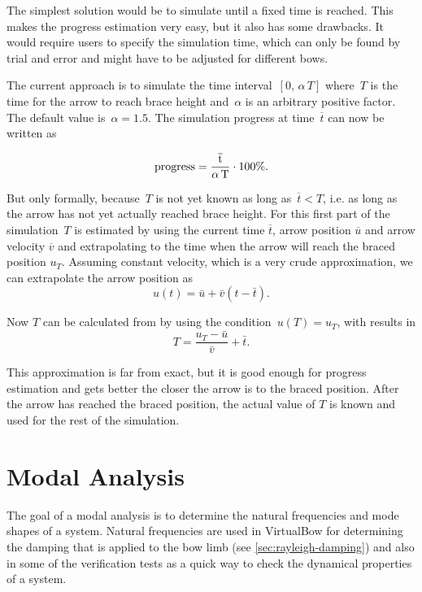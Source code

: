 The simplest solution would be to simulate until a fixed time is reached.
This makes the progress estimation very easy, but it also has some drawbacks.
It would require users to specify the simulation time, which can only be found by trial and error and might have to be adjusted for different bows.

The current approach is to simulate the time interval~$[0,\,\alpha\,T]$ where~$T$ is the time for the arrow to reach brace height and~$\alpha$ is an arbitrary positive factor.
The default value is~$\alpha = 1.5$. The simulation progress at time~$\overline{t}$ can now be written as

\begin{equation}
\rm{progress} = \frac{\overline{t}}{\alpha\,T}\cdot 100\%.
\end{equation}

But only formally, because~$T$ is not yet known as long as~$\overline{t} < T$, i.e. as long as the arrow has not yet actually reached brace height.
For this first part of the simulation~$T$ is estimated by using the current time $\overline{t}$, arrow position $\overline{u}$ and arrow velocity $\overline{v}$ and extrapolating to the time when the arrow will reach the braced position $u_T$.
Assuming constant velocity, which is a very crude approximation, we can extrapolate the arrow position as
\begin{equation}
u(t) = \bar{u} + \bar{v}(t - \bar{t}).\label{eq:solution:progress:ansatz}
\end{equation}

Now $T$ can be calculated from by using the condition~$u(T) = u_T$, with results in
\begin{equation}
T = \frac{u_T - \bar{u}}{\bar{v}} + \bar{t}.
\end{equation}

This approximation is far from exact, but it is good enough for progress estimation and gets better the closer the arrow is to the braced position.
After the arrow has reached the braced position, the actual value of $T$ is known and used for the rest of the simulation.

\newpage
\section{Modal Analysis}

The goal of a modal analysis is to determine the natural frequencies and mode shapes of a system.
Natural frequencies are used in VirtualBow for determining the damping that is applied to the bow limb (see \ref{sec:rayleigh-damping}) and also in some of the verification tests as a quick way to check the dynamical properties of a system.

